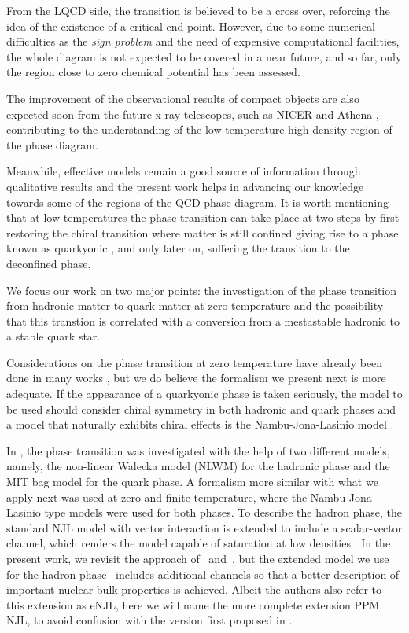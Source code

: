 \documentclass[prc, reprint, amsmath, floatfix,10pt]{revtex4-1}
\begin{document}
From the LQCD side, the transition is believed to be a cross over,
reforcing the idea of the existence of a critical end point. However,
due to some numerical difficulties as the {\it sign problem} and the
need of expensive computational facilities, the whole diagram is not
expected to be covered in a near future, and so far, only the region close to
zero chemical potential has been assessed.

The improvement of the observational results of compact objects are also expected soon from the future x-ray telescopes, such as NICER \cite{NICER} and Athena \cite{ATHENA}, contributing to the understanding of the low temperature-high density region of the phase diagram.

Meanwhile, effective models remain a good source of information
through qualitative results and the present work helps in advancing
our knowledge towards some of the regions of the QCD phase diagram. 
It is worth mentioning that at low temperatures the phase transition can take place at two steps by first restoring the chiral transition where matter is still confined giving rise to a phase known as quarkyonic \cite{quarkyonic}, and only later on, suffering the transition to the deconfined phase. 

We focus our work on two major points: the investigation of the phase transition from hadronic matter to quark matter at zero temperature and the possibility that this transtion is correlated with a conversion from a mestastable hadronic to a stable quark star.

Considerations on the phase transition at zero temperature have
already been done in many works \cite{Cavagnoli2011, Tsue2010,
  Lee2013}, but we do believe the formalism we present next is more
adequate. If the appearance of a quarkyonic phase is taken seriously,
the model to be used should consider chiral symmetry in both hadronic
and quark phases and a model that naturally exhibits chiral effects is
the Nambu-Jona-Lasinio model \cite{NJL}.

 In \cite{Cavagnoli2011}, the phase transition was
investigated with the help of two different models, namely, the
non-linear Walecka model (NLWM) for the hadronic phase and the MIT bag
model for the quark phase. A formalism more similar with what we apply
next was used at zero \cite{Tsue2010} and finite \cite{Lee2013}
temperature, where the Nambu-Jona-Lasinio type models were used for
both phases. To describe the hadron phase, the standard NJL model with
vector interaction is extended to include a scalar-vector channel,
which renders the model capable of saturation at low densities \cite{Koch1987}.
In the present work, we revisit the approach of~\cite{Tsue2010}
and~\cite{Lee2013}, but the extended model we use for the hadron 
phase~\cite{Pais2016} includes  additional channels so that a better 
description of important nuclear bulk properties is achieved.
Albeit the authors also refer to this extension as eNJL, here we will
name the more complete extension PPM NJL, to avoid confusion with the
version first proposed in \cite{Koch1987}.
\end{document}
